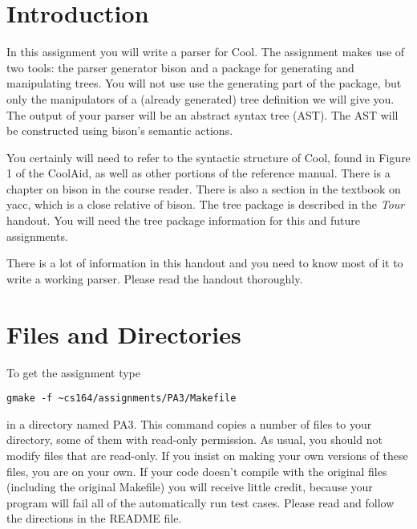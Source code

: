 %
%




%
\def\U#1{{\sf{}#1}}
\def\S#1{{\tt{}#1}} %
\def\C#1{{\bf{}#1}}

\section{Introduction}

In this assignment you will write a parser for Cool.  The assignment
makes use of two tools: the parser generator \U{bison} and a package
for generating and manipulating trees.  You will not use use the
generating part of the package, but only the manipulators of a
(already generated) tree definition we will give you. The output of
your parser will be an abstract syntax tree (AST).  The AST will be
constructed using \U{bison}'s semantic actions.

You certainly will need to refer to the syntactic structure of Cool,
found in Figure 1 of the CoolAid, as well as other portions of the
reference manual.  There is a chapter on \U{bison} in the course
reader.  There is also a section in the textbook on \U{yacc}, which is
a close relative of \U{bison}.  The tree package is described in the
{\em Tour} handout.  You will need the tree package information for this and
future assignments.

There is a lot of information in this handout and you need to know most of
it to write a working parser.  Please read the handout thoroughly.

\section {Files and Directories}

To get the assignment type
\begin{verbatim}
gmake -f ~cs164/assignments/PA3/Makefile
\end{verbatim}
in a directory named \U{PA3}.  This command copies a number
of files to your directory, some of them with read-only permission.
As usual, you should not modify files that are read-only.  If you
insist on making your own versions of these files, you are on your own.
If your code doesn't compile with the original files (including the original
\U{Makefile}) you will receive little credit, because your program will fail
all of the automatically run test cases.
Please read and follow the directions in the \U{README} file.

